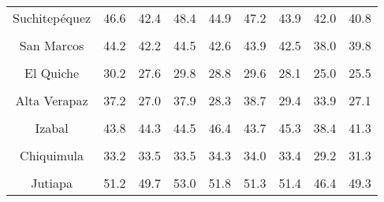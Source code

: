 \begin{tabular}[t]{ccccccccc}
Suchitepéquez & 46.6 & 42.4 & 48.4 & 44.9 & 47.2 & 43.9 & 42.0 & 40.8\\
\cellcolor[HTML]{B6B3FF}{Retalhuleu} & \cellcolor[HTML]{B6B3FF}{54.1} & \cellcolor[HTML]{B6B3FF}{53.6} & \cellcolor[HTML]{B6B3FF}{56.8} & \cellcolor[HTML]{B6B3FF}{89.6} & \cellcolor[HTML]{B6B3FF}{55.8} & \cellcolor[HTML]{B6B3FF}{57.0} & \cellcolor[HTML]{B6B3FF}{50.7} & \cellcolor[HTML]{B6B3FF}{53.7}\\
San Marcos & 44.2 & 42.2 & 44.5 & 42.6 & 43.9 & 42.5 & 38.0 & 39.8\\
\cellcolor[HTML]{B6B3FF}{Huehuetenango} & \cellcolor[HTML]{B6B3FF}{26.4} & \cellcolor[HTML]{B6B3FF}{24.7} & \cellcolor[HTML]{B6B3FF}{25.4} & \cellcolor[HTML]{B6B3FF}{24.8} & \cellcolor[HTML]{B6B3FF}{25.0} & \cellcolor[HTML]{B6B3FF}{24.4} & \cellcolor[HTML]{B6B3FF}{20.7} & \cellcolor[HTML]{B6B3FF}{22.0}\\
El Quiche & 30.2 & 27.6 & 29.8 & 28.8 & 29.6 & 28.1 & 25.0 & 25.5\\
\cellcolor[HTML]{B6B3FF}{Baja Verapaz} & \cellcolor[HTML]{B6B3FF}{41.1} & \cellcolor[HTML]{B6B3FF}{36.6} & \cellcolor[HTML]{B6B3FF}{41.2} & \cellcolor[HTML]{B6B3FF}{37.1} & \cellcolor[HTML]{B6B3FF}{39.1} & \cellcolor[HTML]{B6B3FF}{37.2} & \cellcolor[HTML]{B6B3FF}{33.4} & \cellcolor[HTML]{B6B3FF}{34.2}\\
Alta Verapaz & 37.2 & 27.0 & 37.9 & 28.3 & 38.7 & 29.4 & 33.9 & 27.1\\
\cellcolor[HTML]{B6B3FF}{Petén} & \cellcolor[HTML]{B6B3FF}{39.0} & \cellcolor[HTML]{B6B3FF}{40.4} & \cellcolor[HTML]{B6B3FF}{40.9} & \cellcolor[HTML]{B6B3FF}{43.7} & \cellcolor[HTML]{B6B3FF}{39.9} & \cellcolor[HTML]{B6B3FF}{42.1} & \cellcolor[HTML]{B6B3FF}{30.1} & \cellcolor[HTML]{B6B3FF}{36.3}\\
Izabal & 43.8 & 44.3 & 44.5 & 46.4 & 43.7 & 45.3 & 38.4 & 41.3\\
\cellcolor[HTML]{B6B3FF}{Zacapa} & \cellcolor[HTML]{B6B3FF}{46.1} & \cellcolor[HTML]{B6B3FF}{45.8} & \cellcolor[HTML]{B6B3FF}{48.4} & \cellcolor[HTML]{B6B3FF}{47.7} & \cellcolor[HTML]{B6B3FF}{48.3} & \cellcolor[HTML]{B6B3FF}{48.4} & \cellcolor[HTML]{B6B3FF}{45.2} & \cellcolor[HTML]{B6B3FF}{47.9}\\
Chiquimula & 33.2 & 33.5 & 33.5 & 34.3 & 34.0 & 33.4 & 29.2 & 31.3\\
\cellcolor[HTML]{B6B3FF}{Jalapa} & \cellcolor[HTML]{B6B3FF}{37.8} & \cellcolor[HTML]{B6B3FF}{36.2} & \cellcolor[HTML]{B6B3FF}{38.9} & \cellcolor[HTML]{B6B3FF}{37.7} & \cellcolor[HTML]{B6B3FF}{37.6} & \cellcolor[HTML]{B6B3FF}{36.7} & \cellcolor[HTML]{B6B3FF}{31.4} & \cellcolor[HTML]{B6B3FF}{34.7}\\
Jutiapa & 51.2 & 49.7 & 53.0 & 51.8 & 51.3 & 51.4 & 46.4 & 49.3\\
\bottomrule
\end{tabular}
